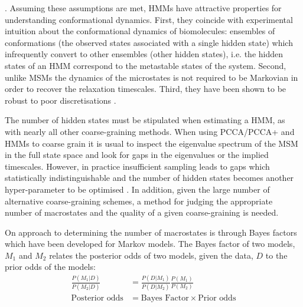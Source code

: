 \cite{noeProjectedHiddenMarkov2013a}. Assuming these assumptions are met, HMMs have attractive properties for understanding conformational dynamics.  First, they coincide with experimental intuition about the conformational dynamics of biomolecules:  ensembles of conformations (the observed states associated with a single hidden state) which infrequently convert to other ensembles (other hidden states), i.e. the hidden states of an HMM correspond to the metastable states of the system. Second, unlike MSMs the dynamics of the microstates is not required to be Markovian in order to recover the relaxation timescales. Third, they have been shown to be robust to poor discretisations \cite{noeProjectedHiddenMarkov2013a}.

The number of hidden states must be stipulated when estimating a HMM, as with nearly all other coarse-graining methods. When using PCCA/PCCA+ \cite{deuflhardIdentificationAlmostInvariant2000a}\cite{deuflhardRobustPerronCluster2005b} and HMMs\cite{noeProjectedHiddenMarkov2013a} to coarse grain it is usual to inspect the eigenvalue spectrum of the MSM in the full state space and look for gaps in the eigenvalues or the implied timescales. However, in practice insufficient sampling leads to gaps which statistically indistinguishable and the number of hidden states becomes another hyper-parameter to be optimised \cite{bowmanQuantitativeComparisonAlternative2013}. In addition, given the large number of alternative coarse-graining schemes, a method for judging the appropriate number of macrostates and the quality of a given coarse-graining  is needed. 

On approach to determining the number of macrostates is through Bayes factors\cite{kassBayesFactors1995} which have been developed \cite{bacalladoBayesianComparisonMarkov2009a} for Markov models. The Bayes factor of two models, $M_{1}$ and $M_{2}$ relates the posterior odds of two models, given the data, $D$ to the prior odds of the models: 
\begin{equation}
   \begin{split}
    \frac{P(M_1|D)}{P(M_2|D)} & = \frac{P(D|M_1)}{P(D|M_2)} \frac{P(M_1)}{P(M_2)}\\
     \text{Posterior odds} &= \text{Bayes Factor} \times \text{Prior odds}
\end{split} 
\end{equation}

